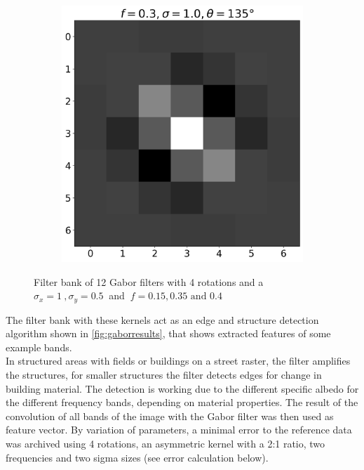\documentclass[12pt,a4paper, english,twoside]{scrartcl}
\begin{document}
\begin{figure}[!htbp]
\begin{subfigure}[b]{0.3\textwidth}
      \end{subfigure}
      \begin{subfigure}[b]{0.3\textwidth}
        \includegraphics[width=\textwidth]{img/K11.png}
      \end{subfigure}
      \caption{Filter bank of 12 Gabor filters with 4 rotations and a $\sigma_x=1\ ,\sigma_y = 0.5\ $ and $\ f = 0.15, 0.35 \text{ and } 0.4$\label{fig:gaborbank}}%
    \end{figure}
    \noindent
    The filter bank with these kernels act as an edge and structure detection algorithm shown in \cref{fig:gaborresults}, that shows extracted features of some example bands.\\
    In structured areas with fields or buildings on a street raster, the filter amplifies the structures, for smaller structures the filter detects edges for change in building material. 
    The detection is working due to the different specific albedo for the different frequency bands, depending on material properties. 
    \noindent 
      The result of the convolution of all bands of the image with the Gabor filter was then used as feature vector. 
      By variation of parameters, a minimal error to the reference data was archived using 4 rotations, an asymmetric kernel with a 2:1 ratio, two frequencies and two sigma sizes (see error calculation below).
\end{document}

